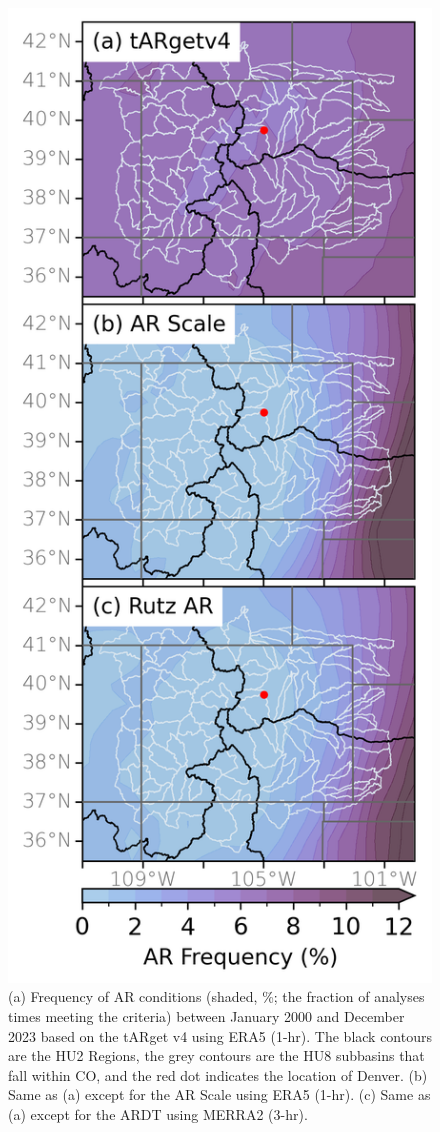 \documentclass[draft]{agujournal2019}
\begin{document}
\begin{figure}
\noindent\includegraphics[scale=0.85, keepaspectratio]{fig2.png}
\caption{(a) Frequency of AR conditions (shaded, \%; the fraction of analyses times meeting the criteria) between January 2000 and December 2023 based on the  tARget v4 using ERA5 (1-hr). The black contours are the HU2 Regions, the grey contours are the HU8 subbasins that fall within CO, and the red dot indicates the location of Denver. (b) Same as (a) except for the AR Scale \cite{MartinRalph2019} using ERA5 (1-hr). (c) Same as (a) except for the  ARDT using MERRA2 (3-hr). }
\label{fig:ar_overhead}
\end{figure}
\end{document}
